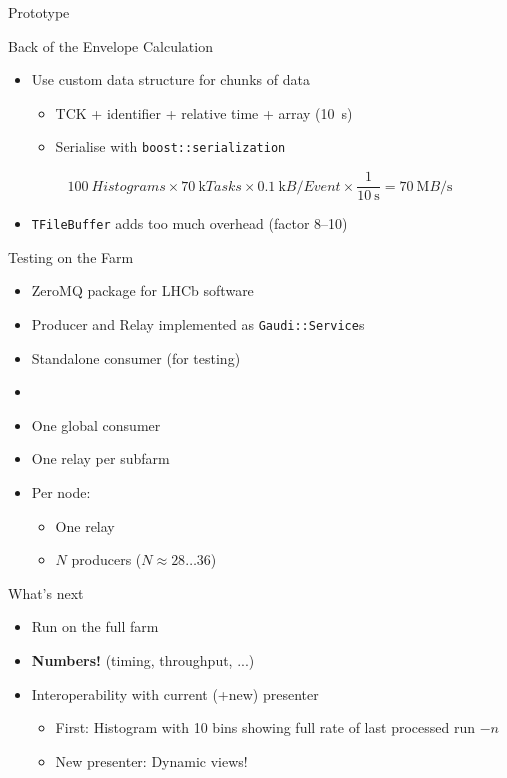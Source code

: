 \documentclass[aspectratio=1610,compress,titleprogressbar]{beamer}
\begin{document}
\begin{frame}{Prototype}
  \begin{block}{Back of the Envelope Calculation}
    \begin{itemize}
      \item Use custom data structure for chunks of data \begin{itemize}
          \item TCK + identifier + relative time + array (\SI{10}{\second})
        \item Serialise with \texttt{boost::serialization}
      \end{itemize}
    \end{itemize}
    \begin{equation*}
      \SI{100}{Histograms} \times \SI{70}{\kilo Tasks} \times \SI{0.1}{\kilo B\per Event} \times \frac{\num{1}}{\SI{10}{\second}} = \SI{70}{\mega B\per\second}
    \end{equation*}

    \begin{itemize}
      \item \texttt{TFileBuffer} adds too much overhead (factor \numrange{8}{10})
    \end{itemize}
  \end{block}
\end{frame}

\begin{frame}{Testing on the Farm}
  \begin{itemize}
    \item ZeroMQ package for LHCb software
    \item Producer and Relay implemented as \texttt{Gaudi::Service}s
    \item Standalone consumer (for testing)
    \item [] {}
    \item One global consumer
    \item One relay per subfarm
    \item Per node: \begin{itemize}
      \item One relay
      \item $N$ producers ($N \approx 28 \dots 36$)
    \end{itemize}
  \end{itemize}
\end{frame}

\begin{frame}{What's next}
  \begin{itemize}
    \item Run on the full farm
    \item \textbf{Numbers!} (timing, throughput, ...)
    \item Interoperability with current (+new) presenter \begin{itemize}
      \item First: Histogram with 10 bins showing full rate of last processed run $-n$
      \item New presenter: Dynamic views!
    \end{itemize}
  \end{itemize}
\end{frame}
\end{document}

